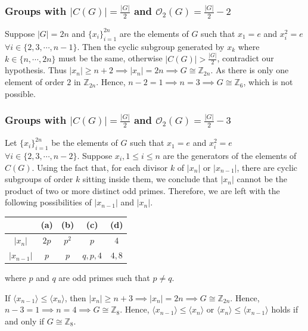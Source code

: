 \documentclass[a4paper,11pt]{amsart}
\numberwithin{equation}{section}
\numberwithin{equation}{subsection}
\begin{document}
\subsubsection{Groups with \texorpdfstring{$|C(G)|=\frac{|G|}{2}$}{|G|/2} and \texorpdfstring{$\mathcal{O}_2(G)=\frac{|G|}{2}-2$}{|G|/2-2}}\label{2.4.2}
Suppose $|G|=2n$ and $\{x_i\}_{i=1}^{2n}$ are the elements of $G$ such that $x_1 = e$ and $x_i^2= e$ $\forall i \in \{2,3,\cdots,n-1\}$. Then the cyclic subgroup generated by $x_k$ where $k\in \{n,\cdots,2n\}$ must be the same, otherwise $|C(G)|>\frac{|G|}{2}$,
contradict our hypothesis.
Thus $|x_n| \geq n+2\implies |x_n| = 2n \implies G\cong \mathbb Z_{2n}$. As there is only one element of order $2$ in $\mathbb Z_{2n}$. Hence, $n-2 = 1\implies n=3\implies G\cong \mathbb{Z}_{6}$, which is not possible.

\subsubsection{Groups with $|C(G)|=\frac{|G|}{2}$ and $\mathcal{O}_2(G)=\frac{|G|}{2}-3$} \label{2.4.3}
Let $\{x_i\}_{i=1}^{2n}$ be the elements of $G$ such that $x_1 = e$ and $x_i^2= e$ $\forall i \in \{2,3,\cdots,n-2\}$.
Suppose $x_i, 1 \leq i \leq n$ are the generators of the elements of $C(G)$.
Using the fact that,  for each divisor $k$ of $|x_{n}|$ or $|x_{n-1}|$, there are  cyclic subgroups of  order $k$ sitting inside them, we conclude that
  $|x_{n}|$ cannot be the product of two or more distinct odd primes. Therefore, 
 we are left with the following possibilities of $|x_{n-1}|$ and $|x_n|$.
\begin{center}
\begin{tabular}{ |c|c|c|c|c| } 
\hline
 & (a) & (b) & (c) &(d)\\
\hline
$|x_{n}|$ & $2p$ & $p^{2}$  & $p$ & $4$ \\ 
$|x_{n-1}|$ & $p$ & $p$ & $q,p,4$ & $4,8$\\ 
\hline
\end{tabular}
\end{center}
where $p$ and $q$ are odd primes such that $p\neq q$. 


If $\langle x_{n-1}\rangle \leq \langle x _{n} \rangle$, then $|x_n| \geq n+3\implies |x_n| = 2n \implies G\cong \mathbb Z_{2n}$. Hence, $n-3 = 1\implies n=4\implies G\cong \mathbb{Z}_{8}$. 
 Hence,  $\langle x_{n-1}\rangle \leq \langle x _{n} \rangle$ or $\langle x_{n}\rangle \leq \langle x _{n-1} \rangle$ holds if and only if $G \cong \mathbb{Z}_{8}$.
 
\end{document}
